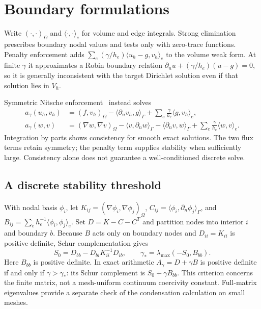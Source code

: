 \documentclass[11pt,a4paper]{article}
\begin{document}
\section{Boundary formulations}
Write $(\cdot,\cdot)_\Omega$ and $\langle\cdot,\cdot\rangle_e$ for volume and edge
integrals. Strong elimination prescribes boundary nodal values and tests only with
zero-trace functions. Penalty enforcement adds
$\sum_e(\gamma/h_e)\langle u_h-g,v_h\rangle_e$ to the volume weak form.
At finite $\gamma$ it approximates a Robin boundary relation
$\partial_n u+(\gamma/h_e)(u-g)=0$, so it is generally inconsistent with the
target Dirichlet solution even if that solution lies in $V_h$.

\newpage
Symmetric Nitsche enforcement~\cite{nitsche,dokken} instead solves
\begin{align}
 a_\gamma(u_h,v_h)&=(f,v_h)_\Omega
 -\langle\partial_n v_h,g\rangle_\Gamma
 +\sum_e\frac{\gamma}{h_e}\langle g,v_h\rangle_e,\label{eq:nitsche}\\
 a_\gamma(w,v)&=(\nabla w,\nabla v)_\Omega
 -\langle v,\partial_n w\rangle_\Gamma
 -\langle\partial_n v,w\rangle_\Gamma
 +\sum_e\frac{\gamma}{h_e}\langle w,v\rangle_e .\nonumber
\end{align}
Integration by parts shows consistency for smooth exact solutions. The two flux
terms retain symmetry; the penalty term supplies stability when sufficiently large.
Consistency alone does not guarantee a well-conditioned discrete solve.

\subsection{A discrete stability threshold}
With nodal basis $\phi_i$, let $K_{ij}=(\nabla\phi_i,\nabla\phi_j)_\Omega$,
$C_{ij}=\langle\phi_i,\partial_n\phi_j\rangle_\Gamma$, and
$B_{ij}=\sum_e h_e^{-1}\langle\phi_i,\phi_j\rangle_e$.
Set $D=K-C-C^T$ and partition nodes into interior $i$ and boundary $b$.
Because $B$ acts only on boundary nodes and $D_{ii}=K_{ii}$ is positive definite,
Schur complementation gives
\begin{equation}
 S_0=D_{bb}-D_{bi}K_{ii}^{-1}D_{ib},\qquad
 \gamma_*=\lambda_{\max}(-S_0,B_{bb}).\label{eq:threshold}
\end{equation}
Here $B_{bb}$ is positive definite. In exact arithmetic $A_\gamma=D+\gamma B$
is positive definite if and only if $\gamma>\gamma_*$: its Schur complement is
$S_0+\gamma B_{bb}$. This criterion concerns the finite matrix, not a
mesh-uniform continuum coercivity constant. Full-matrix eigenvalues provide a
separate check of the condensation calculation on small meshes.
\end{document}
